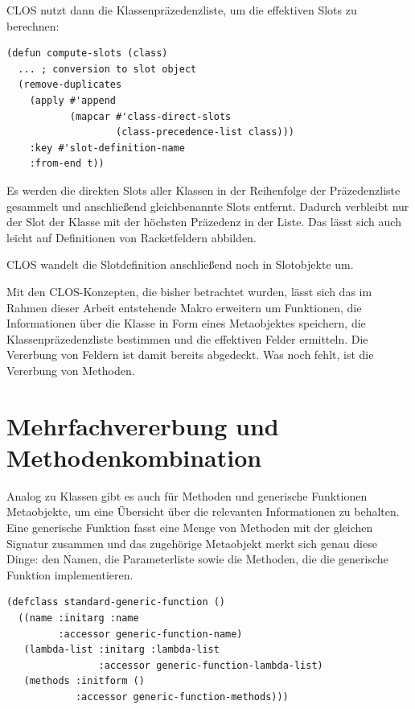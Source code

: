 CLOS nutzt dann die Klassenpräzedenzliste, um die effektiven Slots zu berechnen:

\begin{lstlisting}
(defun compute-slots (class)
  ... ; conversion to slot object
  (remove-duplicates
    (apply #'append 
           (mapcar #'class-direct-slots
                   (class-precedence-list class)))
    :key #'slot-definition-name
    :from-end t))
\end{lstlisting}

Es werden die direkten Slots aller Klassen in der Reihenfolge der Präzedenzliste gesammelt und anschließend gleichbenannte Slots entfernt. Dadurch verbleibt nur der Slot der Klasse mit der höchsten Präzedenz in der Liste. Das lässt sich auch leicht auf Definitionen von Racketfeldern abbilden.

CLOS wandelt die Slotdefinition anschließend noch in Slotobjekte um. %

Mit den CLOS-Konzepten, die bisher betrachtet wurden, lässt sich das im Rahmen dieser Arbeit entstehende Makro erweitern um Funktionen, die Informationen über die Klasse in Form eines Metaobjektes speichern, die Klassenpräzedenzliste bestimmen und  die effektiven Felder ermitteln. Die Vererbung von Feldern ist damit bereits abgedeckt. Was noch fehlt, ist die Vererbung von Methoden.

\section{Mehrfachvererbung und Methodenkombination}
Analog zu Klassen gibt es auch für Methoden und generische Funktionen Metaobjekte, um eine Übersicht über die relevanten Informationen zu behalten. Eine generische Funktion fasst eine Menge von Methoden mit der gleichen Signatur zusammen und das zugehörige Metaobjekt merkt sich genau diese Dinge: den Namen, die Parameterliste sowie die Methoden, die die generische Funktion implementieren.

\begin{lstlisting}
(defclass standard-generic-function ()
  ((name :initarg :name
         :accessor generic-function-name)
   (lambda-list :initarg :lambda-list
                :accessor generic-function-lambda-list)
   (methods :initform ()
            :accessor generic-function-methods)))
\end{lstlisting}

